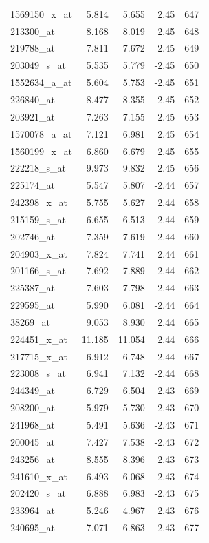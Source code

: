 \begin{footnotesize}
\begin{longtable}{lrrrr}
1569150\_x\_at & 5.814 & 5.655 & 2.45 & 647 \\
213300\_at & 8.168 & 8.019 & 2.45 & 648 \\
219788\_at & 7.811 & 7.672 & 2.45 & 649 \\
203049\_s\_at & 5.535 & 5.779 & -2.45 & 650 \\
1552634\_a\_at & 5.604 & 5.753 & -2.45 & 651 \\
226840\_at & 8.477 & 8.355 & 2.45 & 652 \\
203921\_at & 7.263 & 7.155 & 2.45 & 653 \\
1570078\_a\_at & 7.121 & 6.981 & 2.45 & 654 \\
1560199\_x\_at & 6.860 & 6.679 & 2.45 & 655 \\
222218\_s\_at & 9.973 & 9.832 & 2.45 & 656 \\
225174\_at & 5.547 & 5.807 & -2.44 & 657 \\
242398\_x\_at & 5.755 & 5.627 & 2.44 & 658 \\
215159\_s\_at & 6.655 & 6.513 & 2.44 & 659 \\
202746\_at & 7.359 & 7.619 & -2.44 & 660 \\
204903\_x\_at & 7.824 & 7.741 & 2.44 & 661 \\
201166\_s\_at & 7.692 & 7.889 & -2.44 & 662 \\
225387\_at & 7.603 & 7.798 & -2.44 & 663 \\
229595\_at & 5.990 & 6.081 & -2.44 & 664 \\
38269\_at & 9.053 & 8.930 & 2.44 & 665 \\
224451\_x\_at & 11.185 & 11.054 & 2.44 & 666 \\
217715\_x\_at & 6.912 & 6.748 & 2.44 & 667 \\
223008\_s\_at & 6.941 & 7.132 & -2.44 & 668 \\
244349\_at & 6.729 & 6.504 & 2.43 & 669 \\
208200\_at & 5.979 & 5.730 & 2.43 & 670 \\
241968\_at & 5.491 & 5.636 & -2.43 & 671 \\
200045\_at & 7.427 & 7.538 & -2.43 & 672 \\
243256\_at & 8.555 & 8.396 & 2.43 & 673 \\
241610\_x\_at & 6.493 & 6.068 & 2.43 & 674 \\
202420\_s\_at & 6.888 & 6.983 & -2.43 & 675 \\
233964\_at & 5.246 & 4.967 & 2.43 & 676 \\
240695\_at & 7.071 & 6.863 & 2.43 & 677 \\

\end{longtable}
\end{footnotesize}
